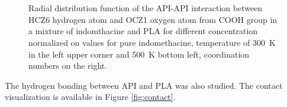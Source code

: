 \begin{figure}[htb!]
	\centering
	\\
	\\
	\caption{Radial distribution function of the API-API interaction between HCZ6 hydrogen atom and OCZ1 oxygen atom from COOH group in a mixture of indomthacine and PLA for different concentration normalized on values for pure indomethacine, temperature of 300~K in the left upper corner and 500~K bottom left, coordination numbers on the right.}
	\label{fig:nap_RDF_}
\end{figure}




The hydrogen bonding between API and PLA was also studied. The contact visualization is available in Figure \ref{fig:contact}.

